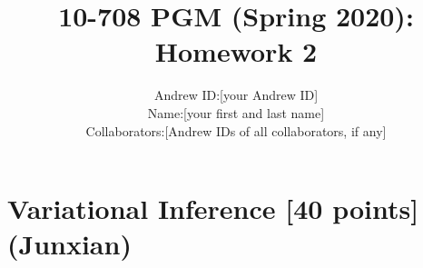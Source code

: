 \documentclass{article}
\title{10-708 PGM (Spring 2020): Homework 2
}
\author{
\begin{tabular}{rl}
Andrew ID: & [your Andrew ID] \\
Name: & [your first and last name] \\
Collaborators: & [Andrew IDs of all collaborators, if any]
\end{tabular}
}
\date{}
\newcommand{\yv}{\mathbf{y}}
\begin{document}
\maketitle





















\section{Variational Inference [40 points] (Junxian)}

\newcommand{\Eb}{\mathbb{E}}
\newcommand{\defeq}{\mathrel{\mathop:}=}
\newcommand{\av}{\mathbf{a}}
\newcommand{\bv}{\mathbf{b}}
\newcommand{\cv}{\mathbf{c}}
\newcommand{\dv}{\mathbf{d}}
\newcommand{\ev}{\mathbf{e}}
\newcommand{\fv}{\mathbf{f}}
\newcommand{\gv}{\mathbf{g}}
\newcommand{\hv}{\mathbf{h}}
\newcommand{\iv}{\mathbf{i}}
\newcommand{\jv}{\mathbf{j}}
\newcommand{\kv}{\mathbf{k}}
\newcommand{\lv}{\mathbf{l}}
\newcommand{\mv}{\mathbf{m}}
\newcommand{\nv}{\mathbf{n}}
\newcommand{\ov}{\mathbf{o}}
\newcommand{\pv}{\mathbf{p}}
\newcommand{\qv}{\mathbf{q}}
\newcommand{\rv}{\mathbf{r}}
\newcommand{\sv}{\mathbf{s}}
\newcommand{\tv}{\mathbf{t}}
\newcommand{\uv}{\mathbf{u}}
\newcommand{\vv}{\mathbf{v}}
\newcommand{\wv}{\mathbf{w}}
\newcommand{\xv}{\mathbf{x}}
\newcommand{\zv}{\mathbf{z}}

\newcommand{\Iv}{\mathbf{I}}

\newcommand{\xdn}{x_{dn}}
\newcommand{\zdn}{z_{dn}}
\newcommand{\tdn}{t_{dn}}
\newcommand{\wdn}{w_{dn}}
\newcommand{\nd}{N_d}

\newcommand{\prodn}{\prod_{n=1}^{N_d}}
\newcommand{\prodk}{\prod_{k=1}^K}
\newcommand{\prodd}{\prod_{d=1}^D}
\newcommand{\prodv}{\prod_{v=1}^V}

\newcommand{\sumd}{\sum_d}
\newcommand{\sumnn}{\sum_n}
\newcommand{\sumk}{\sum_k}
\newcommand{\sumv}{\sum_v}
\newcommand{\sumdn}{\sum_{d, n}}
\newcommand{\sumdnk}{\sum_{d, n, k}}

\newcommand{\ebq}{\Eb_q}
\newcommand{\elbo}{\text{ELBO}}
\newcommand{\psione}{\psi_{k1}}
\newcommand{\psitwo}{\psi_{k2}}
\newcommand{\pidnk}{\pi_{dnk}}
\newcommand{\px}{p(x)}
\newcommand{\qx}{q(x)}
\end{document}
